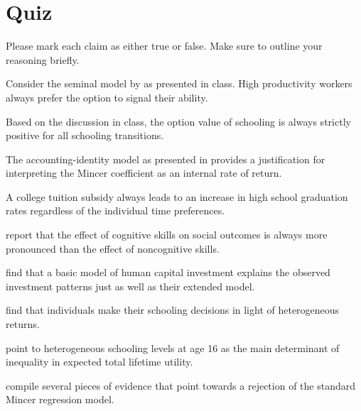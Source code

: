 \FloatBarrier\section{Quiz}
Please mark each claim as either true or false. Make sure to outline your reasoning briefly.

\begin{boenumerate}
\item Consider the seminal model by \cite{Spence.1973} as presented in class. High productivity workers always prefer the option to signal their ability.

\item Based on the discussion in class, the option value of schooling is always strictly positive for all schooling transitions.

\item The accounting-identity model as presented in \cite{Heckman.2006a} provides a justification for interpreting the Mincer coefficient as an internal rate of return.

\item A college tuition subsidy always leads to an increase in high school graduation rates regardless of the individual time preferences.

\item \cite{Heckman.2006b} report that the effect of cognitive skills on social outcomes is always more pronounced than the effect of noncognitive skills.

\item \cite{Keane.1997} find that a basic model of human capital investment explains the observed investment patterns just as well as their extended model.

\item \cite{Carneiro.2011} find that individuals make their schooling decisions in light of heterogeneous returns.

\item \cite{Keane.1997} point to heterogeneous schooling levels at age 16 as the main determinant of inequality in expected total lifetime utility.

\item \cite{Heckman.2006a} compile several pieces of evidence that point towards a rejection of the standard Mincer regression model.


\end{boenumerate}
